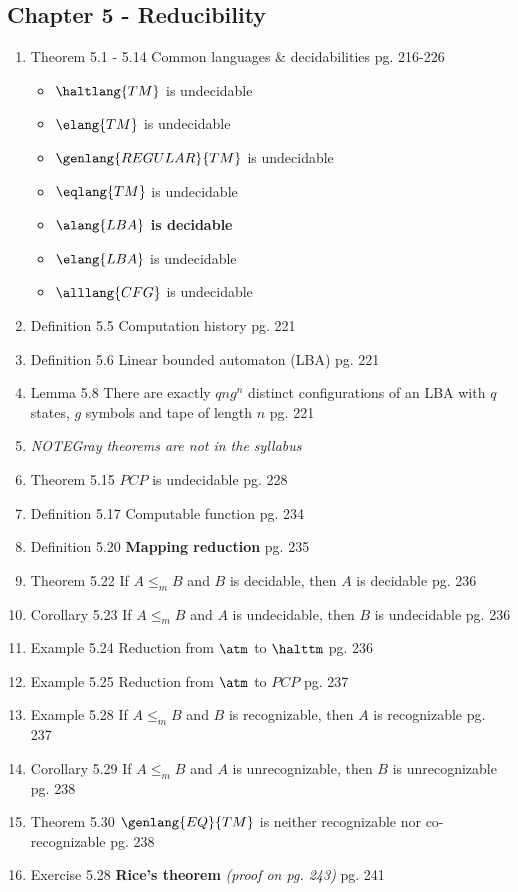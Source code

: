 \documentclass[12pt]{article} %
\newcommand{\theoremitem}[3]{\item #1 \quad #2 \dotfill #3}
\newcommand{\noteitem}[1]{\item \textit{NOTE\quad #1}}
\newenvironment{theoremlist} {
    \begin{enumerate}[nosep,leftmargin=*,label={}]
} {
    \end{enumerate}
}
\begin{document}
\subsection{Chapter 5 - Reducibility}
\begin{theoremlist}
    \theoremitem{Theorem 5.1 - 5.14}
    {Common languages \& decidabilities}
    {pg. 216-226}
    \begin{multicols}{2}
    \begin{itemize}[nosep]
        \item $\haltlang{TM}$ is undecidable 
        \item $\elang{TM}$ is undecidable 
        \item $\genlang{REGULAR}{TM}$ is undecidable 
        \item $\eqlang{TM}$ is undecidable
        \item \textbf{$\alang{LBA}$ is decidable}
        \item $\elang{LBA}$ is undecidable
        \item $\alllang{CFG}$ is undecidable
    \end{itemize}
    \end{multicols}
    \theoremitem{Definition 5.5}
    {Computation history}
    {pg. 221}
    \theoremitem{Definition 5.6}
    {Linear bounded automaton (LBA)}
    {pg. 221}
    \theoremitem{Lemma 5.8}
    {There are exactly $qng^n$ distinct configurations of an LBA with $q$ states, $g$ symbols and tape of length $n$}
    {pg. 221}

    \color{gray} %
    \noteitem{Gray theorems are not in the syllabus}
    \theoremitem{Theorem 5.15}
    {$\mathit{PCP}$ is undecidable}
    {pg. 228}
    \color{black}

    \theoremitem{Definition 5.17}
    {Computable function}
    {pg. 234}
    \theoremitem{Definition 5.20}
    {\textbf{Mapping reduction}}
    {pg. 235}
    \theoremitem{Theorem 5.22}
    {If $A\leq_m B$ and $B$ is decidable, then $A$ is decidable}
    {pg. 236}
    \theoremitem{Corollary 5.23}
    {If $A\leq_m B$ and $A$ is undecidable, then $B$ is undecidable}
    {pg. 236}
    \theoremitem{Example 5.24}
    {Reduction from $\atm$ to $\halttm$}
    {pg. 236}
    \color{gray}
    \theoremitem{Example 5.25}
    {Reduction from $\atm$ to $\mathit{PCP}$}
    {pg. 237}
    \color{black}
    \theoremitem{Example 5.28}
    {If $A\leq_m B$ and $B$ is recognizable, then $A$ is recognizable}
    {pg. 237}
    \theoremitem{Corollary 5.29}
    {If $A\leq_m B$ and $A$ is unrecognizable, then $B$ is unrecognizable}
    {pg. 238}
    \theoremitem{Theorem 5.30}
    {$\genlang{EQ}{TM}$ is neither recognizable nor co-recognizable}
    {pg. 238}
    \theoremitem{Exercise 5.28}
    {\textbf{Rice's theorem} \textit{(proof on pg. 243)}}
    {pg. 241}


\end{theoremlist}
\end{document}
